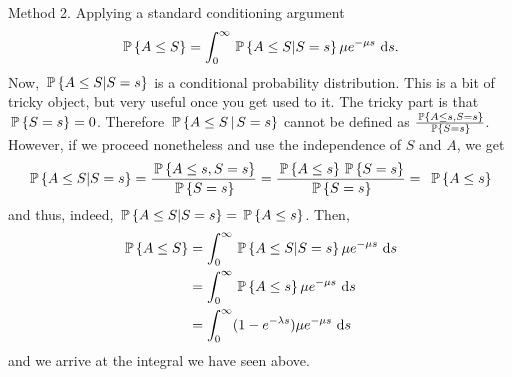 \begin{question}
\begin{solution}
Method 2. Applying a standard conditioning argument
\begin{equation*}
\P{A\leq S} = \int_0^\infty \P{A\leq S| S=s} \mu e^{-\mu s} \,  \d s.
\end{equation*}
Now, $\P{A\leq S| S=s}$ is a conditional probability
distribution. This is a bit of tricky object, but very useful once you
get used to it. The tricky part is that $\P{S=s} = 0$. Therefore
$\P{A\leq S\given S=s}$ cannot be defined as $\frac{\P{A\leq s,
  S=s}}{\P{S=s}}$. However, if we proceed nonetheless and use the
independence of $S$ and $A$, we get
\begin{equation*}
   \P{A\leq S| S=s} = \frac{\P{A\leq s, S=s}}{\P{S=s}} = \frac{\P{A\leq s} \P{S=s}}{\P{S=s}} = \
\P{A\leq s}
 \end{equation*}
 and thus, indeed, $\P{A\leq S| S=s} = \P{A\leq s}$. Then,
\begin{equation*}
  \begin{split}
\P{A\leq S} 
&= \int_0^\infty \P{A\leq S| S=s} \mu e^{-\mu s} \,  \d s \\
&= \int_0^\infty \P{A\leq s} \mu e^{-\mu s} \,  \d s \\
&= \int_0^\infty (1-e^{-\lambda s})\mu e^{-\mu s} \,  \d s \\
  \end{split}
\end{equation*}
and we arrive at the integral we have seen above. 


\end{solution}
\end{question}
